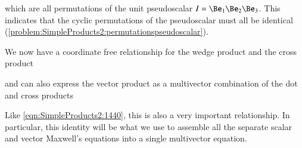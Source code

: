 which are all permutations of the  unit pseudoscalar \( I = \Be_1 \Be_2 \Be_3 \).
This indicates that the cyclic permutations of the  pseudoscalar must all be identical (\cref{problem:SimpleProducts2:permutationspseudoscalar}).

We now have a coordinate free relationship for the  wedge product and the cross product


and can also express the
 vector product as a multivector combination of the dot and cross products


Like
\cref{eqn:SimpleProducts2:1440}, this is also a very important relationship.
In particular, this identity will be what we use to assemble all the separate scalar and vector Maxwell's equations into a single multivector equation.






